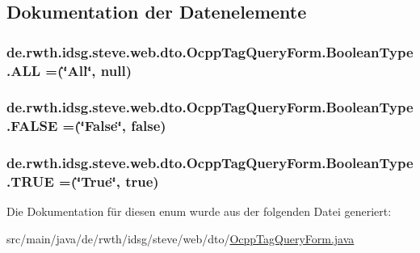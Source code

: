 \subsection{Dokumentation der Datenelemente}
\hypertarget{enumde_1_1rwth_1_1idsg_1_1steve_1_1web_1_1dto_1_1_ocpp_tag_query_form_1_1_boolean_type_aaaf30107196a18dde3ebad7bf1a225ac}{
\subsubsection[{A\-L\-L}]{\setlength{\rightskip}{0pt plus 5cm}de.\-rwth.\-idsg.\-steve.\-web.\-dto.\-Ocpp\-Tag\-Query\-Form.\-Boolean\-Type.\-A\-L\-L =(\char`\"{}All\char`\"{}, null)}}\label{enumde_1_1rwth_1_1idsg_1_1steve_1_1web_1_1dto_1_1_ocpp_tag_query_form_1_1_boolean_type_aaaf30107196a18dde3ebad7bf1a225ac}
\hypertarget{enumde_1_1rwth_1_1idsg_1_1steve_1_1web_1_1dto_1_1_ocpp_tag_query_form_1_1_boolean_type_a75c90c893de3bf25a7d3c5e831e02497}{
\subsubsection[{F\-A\-L\-S\-E}]{\setlength{\rightskip}{0pt plus 5cm}de.\-rwth.\-idsg.\-steve.\-web.\-dto.\-Ocpp\-Tag\-Query\-Form.\-Boolean\-Type.\-F\-A\-L\-S\-E =(\char`\"{}False\char`\"{}, false)}}\label{enumde_1_1rwth_1_1idsg_1_1steve_1_1web_1_1dto_1_1_ocpp_tag_query_form_1_1_boolean_type_a75c90c893de3bf25a7d3c5e831e02497}
\hypertarget{enumde_1_1rwth_1_1idsg_1_1steve_1_1web_1_1dto_1_1_ocpp_tag_query_form_1_1_boolean_type_a1d0cd8f80e6dde69f326cf62cd84fece}{
\subsubsection[{T\-R\-U\-E}]{\setlength{\rightskip}{0pt plus 5cm}de.\-rwth.\-idsg.\-steve.\-web.\-dto.\-Ocpp\-Tag\-Query\-Form.\-Boolean\-Type.\-T\-R\-U\-E =(\char`\"{}True\char`\"{}, true)}}\label{enumde_1_1rwth_1_1idsg_1_1steve_1_1web_1_1dto_1_1_ocpp_tag_query_form_1_1_boolean_type_a1d0cd8f80e6dde69f326cf62cd84fece}


Die Dokumentation für diesen enum wurde aus der folgenden Datei generiert\-:\begin{DoxyCompactItemize}
\item 
src/main/java/de/rwth/idsg/steve/web/dto/\hyperlink{_ocpp_tag_query_form_8java}{Ocpp\-Tag\-Query\-Form.\-java}\end{DoxyCompactItemize}
